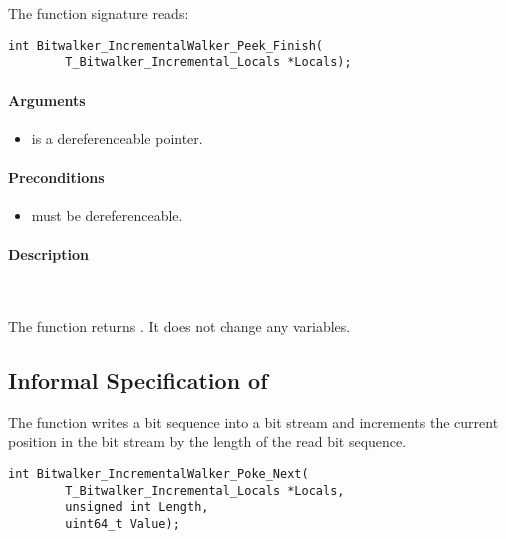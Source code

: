  The function signature reads:\\[1em]

\begin{lstlisting}[style=acsl-block]
int Bitwalker_IncrementalWalker_Peek_Finish(
        T_Bitwalker_Incremental_Locals *Locals);
\end{lstlisting}

\paragraph{Arguments}

\begin{itemize}
   \item  {} is a dereferenceable pointer.
\end{itemize}

\paragraph{Preconditions}
\begin{itemize}
   \item  {} must be dereferenceable.
\end{itemize}

\paragraph{Description}~

The function  returns .
It does not change any variables.


\clearpage

\subsection{Informal Specification of }

The function \pokenext writes a bit sequence into a bit stream 
and increments the current position in the bit stream by the 
length of the read bit sequence.\\[1em]


\begin{lstlisting}[style=acsl-block]
int Bitwalker_IncrementalWalker_Poke_Next(
        T_Bitwalker_Incremental_Locals *Locals,
        unsigned int Length,
        uint64_t Value);
\end{lstlisting}

